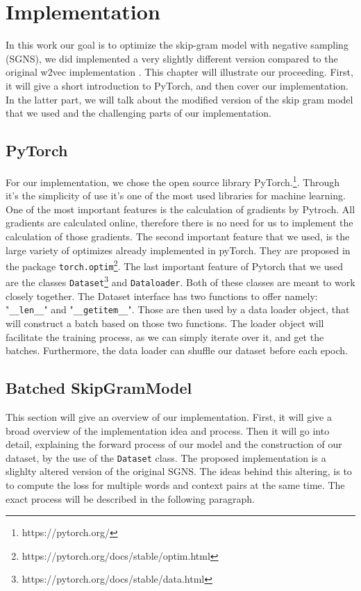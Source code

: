 \chapter{Implementation}\label{chap:implementation}

In this work our goal is to optimize the skip-gram model with negative sampling (SGNS), we did implemented a very slightly different version compared to the original w2vec implementation \cite{mikolov}.
This chapter will illustrate our proceeding. First, it will give a short introduction to PyTorch, and then cover our implementation. In the latter part, we will talk about the modified version of the skip gram model that we used and the challenging parts of our implementation.
\section{PyTorch}
For our implementation, we chose the open source library PyTorch.\footnote{https://pytorch.org/}. Through it's the simplicity of use it's one of the most used libraries for machine learning. One of the most important features is the calculation of gradients by Pytroch. All gradients are calculated online, therefore there is no need for us to implement the calculation of those gradients. The second important feature that we used, is the large variety of optimizes already implemented in pyTorch. They are proposed in the package \texttt{torch.optim}\footnote{https://pytorch.org/docs/stable/optim.html}. The last important feature of Pytorch that we used are the classes \texttt{Dataset}\footnote{\label{note_data}https://pytorch.org/docs/stable/data.html} and \texttt{Dataloader}\footnotemark[\ref{note_data}]. Both of these classes are meant to work closely together.   The Dataset interface has two functions to offer namely: "\texttt{\_\_len\_\_}" and "\texttt{\_\_getitem\_\_}". Those are then used by a data loader object, that will construct a batch based on those two functions. The loader object will facilitate the training process, as we can simply iterate over it, and get the batches. Furthermore, the data loader can shuffle our dataset before each epoch. 

\section{Batched SkipGramModel} \label{ssec:b_SGM}
This section will give an overview of our implementation. First, it will give a broad overview of the implementation idea and process. Then it will go into detail, explaining the forward process of our model and the construction of our dataset, by the use of the \texttt{Dataset} class. The proposed implementation is a slighlty altered version of the original SGNS. The ideas behind this altering, is to to compute the loss for multiple words and context pairs at the same time. The exact process will be described in the following paragraph. 
